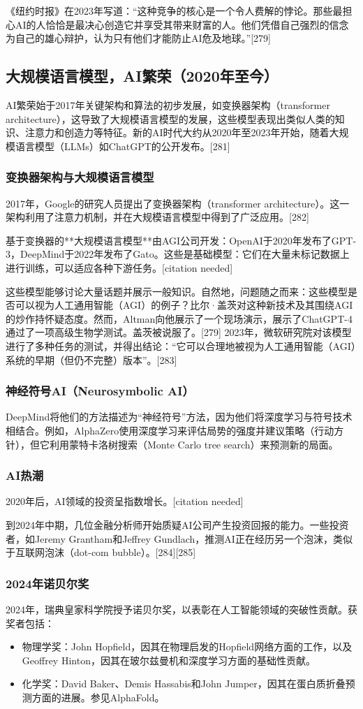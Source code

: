 《纽约时报》在2023年写道：“这种竞争的核心是一个令人费解的悖论。那些最担心AI的人恰恰是最决心创造它并享受其带来财富的人。他们凭借自己强烈的信念为自己的雄心辩护，认为只有他们才能防止AI危及地球。”[279]
\subsection{大规模语言模型，AI繁荣（2020年至今）} 
AI繁荣始于2017年关键架构和算法的初步发展，如变换器架构（transformer architecture），这导致了大规模语言模型的发展，这些模型表现出类似人类的知识、注意力和创造力等特征。新的AI时代大约从2020年至2023年开始，随着大规模语言模型（LLMs）如ChatGPT的公开发布。[281]
\subsubsection{变换器架构与大规模语言模型} 
2017年，Google的研究人员提出了变换器架构（transformer architecture）。这一架构利用了注意力机制，并在大规模语言模型中得到了广泛应用。[282]

基于变换器的**大规模语言模型**由AGI公司开发：OpenAI于2020年发布了GPT-3，DeepMind于2022年发布了Gato。这些是基础模型：它们在大量未标记数据上进行训练，可以适应各种下游任务。[citation needed]

这些模型能够讨论大量话题并展示一般知识。自然地，问题随之而来：这些模型是否可以视为人工通用智能（AGI）的例子？比尔·盖茨对这种新技术及其围绕AGI的炒作持怀疑态度。然而，Altman向他展示了一个现场演示，展示了ChatGPT-4通过了一项高级生物学测试。盖茨被说服了。[279] 2023年，微软研究院对该模型进行了多种任务的测试，并得出结论：“它可以合理地被视为人工通用智能（AGI）系统的早期（但仍不完整）版本”。[283]
\subsubsection{神经符号AI（Neurosymbolic AI）}
DeepMind将他们的方法描述为“神经符号”方法，因为他们将深度学习与符号技术相结合。例如，AlphaZero使用深度学习来评估局势的强度并建议策略（行动方针），但它利用蒙特卡洛树搜索（Monte Carlo tree search）来预测新的局面。
\subsubsection{AI热潮}
2020年后，AI领域的投资呈指数增长。[citation needed]  

到2024年中期，几位金融分析师开始质疑AI公司产生投资回报的能力。一些投资者，如Jeremy Grantham和Jeffrey Gundlach，推测AI正在经历另一个泡沫，类似于互联网泡沫（dot-com bubble）。[284][285]  
\subsubsection{2024年诺贝尔奖} 
2024年，瑞典皇家科学院授予诺贝尔奖，以表彰在人工智能领域的突破性贡献。获奖者包括：  
\begin{itemize}
\item 物理学奖：John Hopfield，因其在物理启发的Hopfield网络方面的工作，以及Geoffrey Hinton，因其在玻尔兹曼机和深度学习方面的基础性贡献。  
\item 化学奖：David Baker、Demis Hassabis和John Jumper，因其在蛋白质折叠预测方面的进展。参见AlphaFold。
\end{itemize}
